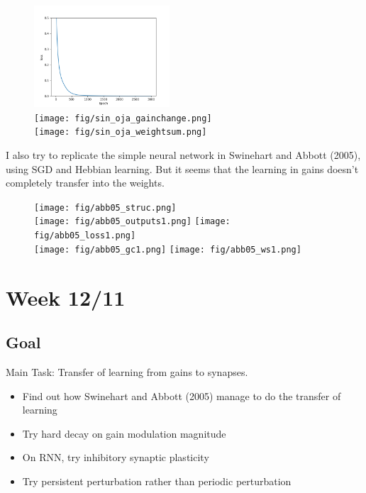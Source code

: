 \documentclass[12pt, a4paper]{article}
\begin{document}
\begin{figure}[H]
    \centering
    \includegraphics[width=0.45\textwidth]{fig/sin_oja_loss.png} \\
    \texttt{[image: fig/sin\_oja\_gainchange.png]} \\
    \texttt{[image: fig/sin\_oja\_weightsum.png]}
    \label{fig:1}
\end{figure}

I also try to replicate the simple neural network in Swinehart and Abbott (2005), using SGD and Hebbian learning. But it seems that the learning in gains doesn't completely transfer into the weights.

\begin{figure}[H]
    \centering
    \texttt{[image: fig/abb05\_struc.png]} \\
    \texttt{[image: fig/abb05\_outputs1.png]}
    \texttt{[image: fig/abb05\_loss1.png]} \\
    \texttt{[image: fig/abb05\_gc1.png]}
    \texttt{[image: fig/abb05\_ws1.png]}
    \label{fig:1}
\end{figure}

\newpage


\section*{Week 12/11}

\subsection*{Goal}

\noindent
Main Task: Transfer of learning from gains to synapses.

\begin{itemize}
    \item Find out how Swinehart and Abbott (2005) manage to do the transfer of learning
    \item Try hard decay on gain modulation magnitude
    \item On RNN, try inhibitory synaptic plasticity
    \item Try persistent perturbation rather than periodic perturbation
\end{itemize}
\end{document}
